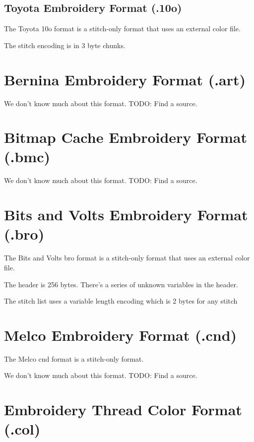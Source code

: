 \subsection{Toyota Embroidery Format (.10o)}

The Toyota 10o format is a stitch-only format that uses an external color file.

The stitch encoding is in 3 byte chunks.

\section{Bernina Embroidery Format (.art)}

We don't know much about this format. TODO: Find a source.

\section{Bitmap Cache Embroidery Format (.bmc)}

We don't know much about this format. TODO: Find a source.

\section{Bits and Volts Embroidery Format (.bro)}

The Bits and Volts bro format is a stitch-only format that uses an external color file.

The header is 256 bytes. There's a series of unknown variables in the header.

The stitch list uses a variable length encoding which is 2 bytes for any stitch

\section{Melco Embroidery Format (.cnd)}

The Melco cnd format is a stitch-only format.

We don't know much about this format. TODO: Find a source.

\section{Embroidery Thread Color Format (.col)}


